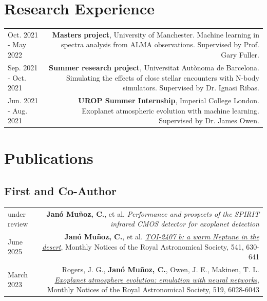 \documentclass{article}
\begin{document}
\section*{Research Experience}

\begin{tabular}{L!{\vrule}R}
    Oct. 2021 - May 2022 & \textbf{Masters project}, University of Manchester. Machine learning in spectra analysis from ALMA observations. Supervised by Prof. Gary Fuller.\\
    Sep. 2021 - Oct. 2021 & \textbf{Summer research project}, Universitat Autònoma de Barcelona. Simulating the effects of close stellar encounters with N-body simulators. Supervised by Dr. Ignasi Ribas. \\
    Jun. 2021 - Aug. 2021 & \textbf{UROP Summer Internship}, Imperial College London. Exoplanet atmospheric evolution with machine learning. Supervised by Dr. James Owen.\\
\end{tabular}

\section*{Publications}

\subsection*{First and Co-Author}

\begin{tabular}{L!{\vrule}R}
    under review &
    \textbf{Janó Muñoz, C.}, et al.
    {\textit{Performance and prospects of the SPIRIT infrared CMOS detector for exoplanet detection}}\\

    June 2025 &
    \textbf{Janó Muñoz, C.}, et al.
    \href{https://ui.adsabs.harvard.edu/abs/2025MNRAS.541..630J/abstract}{\textit{TOI-2407 b: a warm Neptune in the desert}},
    Monthly Notices of the Royal Astronomical Society, 541, 630-641 \\

    March 2023 &
    Rogers, J. G., \textbf{Janó Muñoz, C.}, Owen, J. E., Makinen, T. L.
    \href{https://ui.adsabs.harvard.edu/abs/2023MNRAS.519.6028R/abstract}{\textit{Exoplanet atmosphere evolution: emulation with neural networks}},
    Monthly Notices of the Royal Astronomical Society, 519, 6028-6043 \\

\end{tabular}
\end{document}

